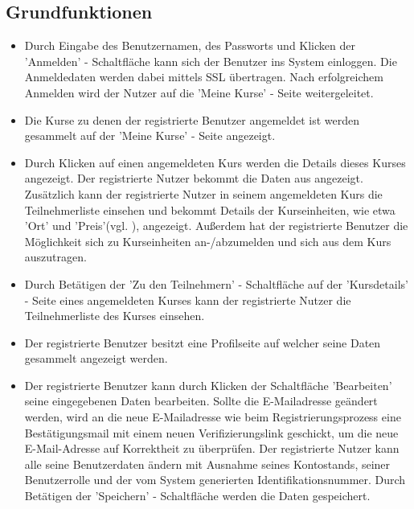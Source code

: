 \documentclass[a4paper]{scrreprt}
\begin{document}
		\subsection{Grundfunktionen}
			\begin{itemize}
				\item {}
					Durch Eingabe des Benutzernamen, des Passworts und Klicken der 'Anmelden' - Schaltfläche kann sich der Benutzer ins System einloggen. Die Anmeldedaten werden dabei mittels \gls{SSL} übertragen. Nach erfolgreichem Anmelden wird der Nutzer auf die 'Meine Kurse' - Seite weitergeleitet.
				\item {}
					Die Kurse zu denen der registrierte Benutzer angemeldet ist werden gesammelt auf der 'Meine Kurse' - Seite angezeigt.
				\item {}
					Durch Klicken auf einen angemeldeten Kurs werden die Details dieses Kurses angezeigt. Der registrierte Nutzer bekommt die Daten aus  angezeigt. Zusätzlich kann der registrierte Nutzer in seinem angemeldeten Kurs die Teilnehmerliste einsehen und bekommt Details der Kurseinheiten, wie etwa 'Ort' und 'Preis'(vgl. ), angezeigt. Außerdem hat der registrierte Benutzer die Möglichkeit sich zu Kurseinheiten an-/abzumelden und sich aus dem Kurs auszutragen.
				\item {}
				    Durch Betätigen der 'Zu den Teilnehmern' - Schaltfläche auf der 'Kursdetails' - Seite eines angemeldeten Kurses kann der registrierte Nutzer die Teilnehmerliste des Kurses einsehen. 
				\item {}
					Der registrierte Benutzer besitzt eine Profilseite auf welcher seine Daten gesammelt angezeigt werden. 
				\item {}
					Der registrierte Benutzer kann durch Klicken der Schaltfläche 'Bearbeiten' seine eingegebenen Daten bearbeiten. Sollte die E-Mailadresse geändert werden, wird an die neue E-Mailadresse wie beim Registrierungsprozess eine Bestätigungsmail mit einem neuen Verifizierungslink geschickt, um die neue E-Mail-Adresse auf Korrektheit zu überprüfen. Der registrierte Nutzer kann alle seine Benutzerdaten ändern mit Ausnahme seines Kontostands, seiner Benutzerrolle und der vom System generierten Identifikationsnummer. Durch Betätigen der 'Speichern' - Schaltfläche werden die Daten gespeichert.

\end{itemize}
\end{document}
